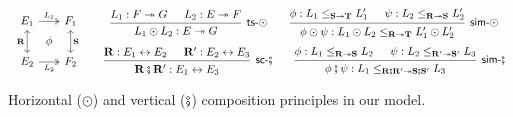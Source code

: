 \begin{figure} %
  \[
  \begin{array}{c}
    \begin{tikzcd}[sep=0.5ex]
      E_1 \ar[dd, leftrightarrow, "\mathbf{R}"']
	  \ar[rr, twoheadrightarrow, "L_1"] &&
      F_1 \ar[dd, leftrightarrow, "\mathbf{S}"] \\
      & \phi & \\
      E_2 \ar[rr, twoheadrightarrow, "L_2"'] &&
      F_2
    \end{tikzcd}
  \end{array}
  \quad
  \begin{array}{c}
    \begin{prooftree}
      \hypo{L_1 : F \twoheadrightarrow G}
      \hypo{L_2 : E \twoheadrightarrow F}
      \infer2[\kw{ts}-$\odot$]{L_1 \odot L_2 : E \twoheadrightarrow G}
    \end{prooftree}
    \qquad
    \begin{prooftree}
      \hypo{\phi: L_1 \le_{\mathbf{S} \twoheadrightarrow \mathbf{T}} L_1'}
      \hypo{\psi: L_2 \le_{\mathbf{R} \twoheadrightarrow \mathbf{S}} L_2'}
      \infer2[\kw{sim}-$\odot$]{\phi \odot \psi :
	L_1 \odot L_2 \le_{\mathbf{R} \twoheadrightarrow \mathbf{T}} L_1' \odot L_2'}
    \end{prooftree}
    \\[1.5em]
    \begin{prooftree}
      \hypo{\mathbf{R} : E_1 \leftrightarrow E_2}
      \hypo{\mathbf{R}' : E_2 \leftrightarrow E_3}
      \infer2[\kw{sc}-$\vcomp$]{\mathbf{R} \vcomp \mathbf{R}' : E_1 \leftrightarrow E_3}
    \end{prooftree}
    \qquad
    \begin{prooftree}
      \hypo{\phi : L_1 \le_{\mathbf{R} \twoheadrightarrow \mathbf{S}} L_2}
      \hypo{\psi : L_2 \le_{\mathbf{R'} \twoheadrightarrow \mathbf{S'}} L_3}
      \infer2[\kw{sim}-$\vcomp$]{\phi \vcomp \psi : L_1 \le_{\mathbf{R} \vcomp \mathbf{R'} \twoheadrightarrow
	\mathbf{S} \vcomp \mathbf{S'}} L_3}
    \end{prooftree}
  \end{array}
\]
  \caption{Horizontal ($\odot$) and vertical ($\fatsemi$)
    composition principles in our model.}
  \label{fig:hvcomp}
\end{figure}


